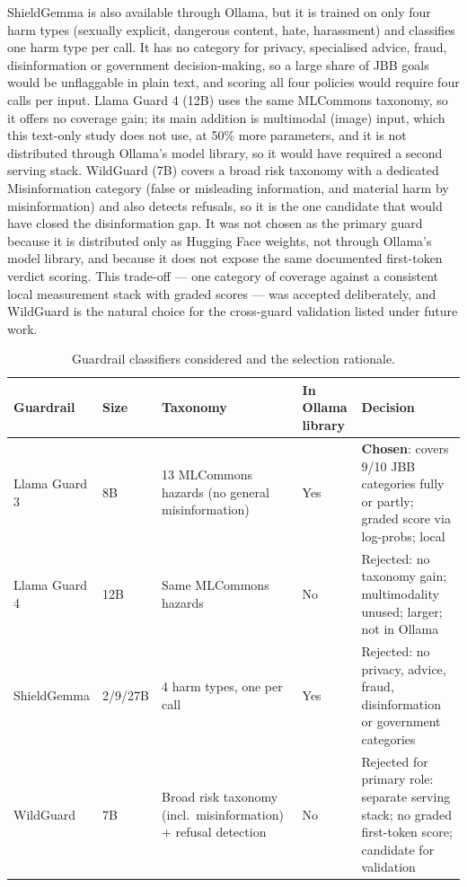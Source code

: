 \documentclass[a4paper,12pt]{article}
\begin{document}
ShieldGemma \cite{zeng2024shieldgemma} is also available through Ollama, but it is
trained on only four harm types (sexually explicit, dangerous content, hate,
harassment) and classifies one harm type per call. It has no category for privacy,
specialised advice, fraud, disinformation or government decision-making, so a large
share of JBB goals would be unflaggable in plain text, and scoring all four policies
would require four calls per input. Llama Guard 4 (12B) \cite{meta2025llamaguard4}
uses the same MLCommons taxonomy, so it offers no coverage gain; its main addition
is multimodal (image) input, which this text-only study does not use, at 50\% more
parameters, and it is not distributed through Ollama's model library, so it would
have required a second serving stack. WildGuard \cite{han2024wildguard} (7B) covers
a broad risk taxonomy with a dedicated Misinformation category (false or misleading
information, and material harm by misinformation) and also detects refusals, so it is
the one candidate that would have closed the disinformation gap. It was not chosen as
the primary guard because it is distributed only as Hugging Face weights, not through
Ollama's model library, and because it does not expose the same documented
first-token verdict scoring. This
trade-off --- one category of coverage against a consistent local measurement stack
with graded scores --- was accepted deliberately, and WildGuard is the natural
choice for the cross-guard validation listed under future work.

\begin{table}[htbp]
\centering
\small
\begin{tabular}{p{2.6cm}p{1.2cm}p{3.6cm}p{1.6cm}p{4.2cm}}
\toprule
Guardrail & Size & Taxonomy & In Ollama library & Decision \\
\midrule
Llama Guard 3 \cite{meta2024llamaguard3} & 8B & 13 MLCommons hazards (no general
misinformation) & Yes & \textbf{Chosen}: covers 9/10 JBB categories fully or
partly; graded score via log-probs; local \\
Llama Guard 4 \cite{meta2025llamaguard4} & 12B & Same MLCommons hazards & No &
Rejected: no taxonomy gain; multimodality unused; larger; not in Ollama \\
ShieldGemma \cite{zeng2024shieldgemma} & 2/9/27B & 4 harm types, one per call &
Yes & Rejected: no privacy, advice, fraud, disinformation or government
categories \\
WildGuard \cite{han2024wildguard} & 7B & Broad risk taxonomy (incl.\ misinformation)
+ refusal detection & No & Rejected for primary role: separate serving stack; no
graded first-token score; candidate for validation \\
\bottomrule
\end{tabular}
\caption{Guardrail classifiers considered and the selection rationale.}
\label{tab:guards}
\end{table}
\end{document}
